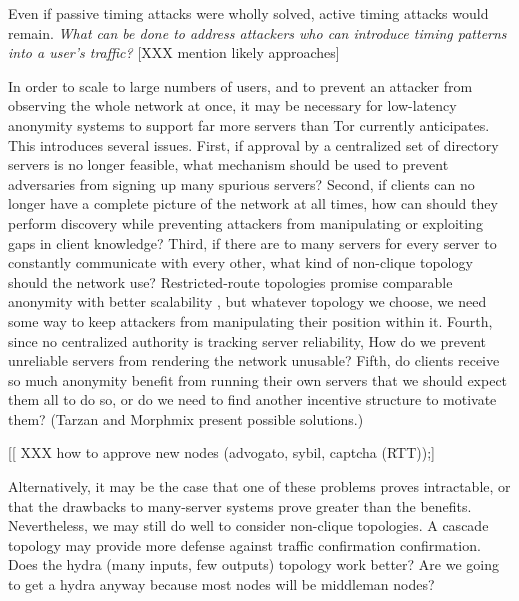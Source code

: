 \documentclass[times,10pt,twocolumn]{article}
\begin{document}
Even if passive timing attacks were wholly solved, active timing
attacks would remain.  \emph{What can
  be done to address attackers who can introduce timing patterns into
  a user's traffic?}  [XXX mention likely approaches]

%

In order to scale to large numbers of users, and to prevent an
attacker from observing the whole network at once, it may be necessary
for low-latency anonymity systems to support far more servers than Tor
currently anticipates.  This introduces several issues.  First, if
approval by a centralized set of directory servers is no longer
feasible, what mechanism should be used to prevent adversaries from
signing up many spurious servers? 
Second, if clients can no longer have a complete
picture of the network at all times, how can should they perform
discovery while preventing attackers from manipulating or exploiting
gaps in client knowledge?  Third, if there are to many servers
for every server to constantly communicate with every other, what kind
of non-clique topology should the network use?   Restricted-route
topologies promise comparable anonymity with better scalability
\cite{danezis-pets03}, but whatever topology we choose, we need some
way to keep attackers from manipulating their position within it.
Fourth, since no centralized authority is tracking server reliability,
How do we prevent unreliable servers from rendering the network
unusable?  Fifth, do clients receive so much anonymity benefit from
running their own servers that we should expect them all to do so, or
do we need to find another incentive structure to motivate them?
(Tarzan and Morphmix present possible solutions.)

[[ XXX how to approve new nodes (advogato, sybil, captcha (RTT));]

Alternatively, it may be the case that one of these problems proves
intractable, or that the drawbacks to many-server systems prove
greater than the benefits.  Nevertheless, we may still do well to
consider non-clique topologies.  A cascade topology may provide more
defense against traffic confirmation confirmation.
Does the hydra (many inputs, few outputs) topology work
better? Are we going to get a hydra anyway because most nodes will be
middleman nodes?
\end{document}
